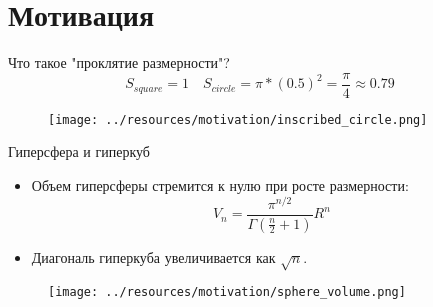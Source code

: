 \section{Мотивация}

\begin{frame}{Что такое "проклятие размерности"?}
    $$
        S_{square}=1 \quad S_{circle}=\pi*(0.5)^2=\frac{\pi}{4}\approx0.79
    $$
    \begin{figure}
        \texttt{[image: ../resources/motivation/inscribed\_circle.png]}
    \end{figure}
\end{frame}

\begin{frame}{Гиперсфера и гиперкуб}
    \begin{itemize}
        \item Объем гиперсферы стремится к нулю при росте размерности:
              \begin{equation*}
                  V_n = \frac{\pi^{n/2}}{\Gamma(\frac{n}{2}+1)}R^n
              \end{equation*}
        \item Диагональ гиперкуба увеличивается как \(\sqrt{n}\).
    \end{itemize}
    \begin{figure}
        \centering
        \texttt{[image: ../resources/motivation/sphere\_volume.png]}
    \end{figure}
\end{frame}
